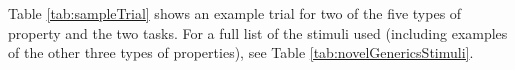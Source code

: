 \documentclass[10pt,letterpaper]{article}
\begin{document}
 
Table \ref{tab:sampleTrial} shows an example trial for two of the five types of property and the two tasks.
For a full list of the stimuli used (including examples of the other three types of properties), see Table \ref{tab:novelGenericsStimuli}.
\end{document}
